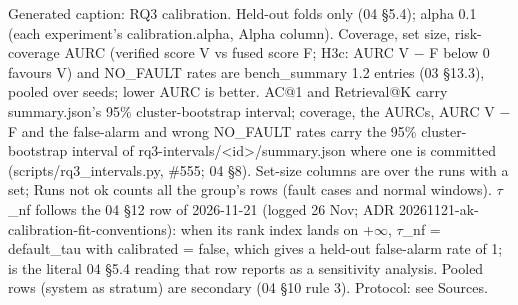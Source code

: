 \noindent Generated caption: RQ3 calibration. Held-out folds only (04 \S{}5.4); alpha 0.1 (each experiment's calibration.alpha, Alpha column). Coverage, set size, risk-coverage AURC (verified score V vs fused score F; H3c: AURC V $-$ F below 0 favours V) and NO\_FAULT rates are bench\_summary 1.2 entries (03 \S{}13.3), pooled over seeds; lower AURC is better. AC@1 and Retrieval@K carry summary.json's 95\% cluster-bootstrap interval; coverage, the AURCs, AURC V $-$ F and the false-alarm and wrong NO\_FAULT rates carry the 95\% cluster-bootstrap interval of rq3-intervals/\allowbreak{}\textless{}id\textgreater{}/\allowbreak{}summary.json where one is committed (scripts/\allowbreak{}rq3\_intervals.py, \#555; 04 \S{}8). Set-size columns are over the runs with a set; Runs not ok counts all the group's rows (fault cases and normal windows). $\tau$\_nf follows the 04 \S{}12 row of 2026-11-21 (logged 26 Nov; ADR 20261121-ak-calibration-fit-conventions): when its rank index lands on +$\infty$, $\tau$\_nf = default\_tau with calibrated = false, which gives a held-out false-alarm rate of 1;  is the literal 04 \S{}5.4 reading that row reports as a sensitivity analysis. Pooled rows (system as stratum) are secondary (04 \S{}10 rule 3). Protocol: see Sources.\par
\endgroup
